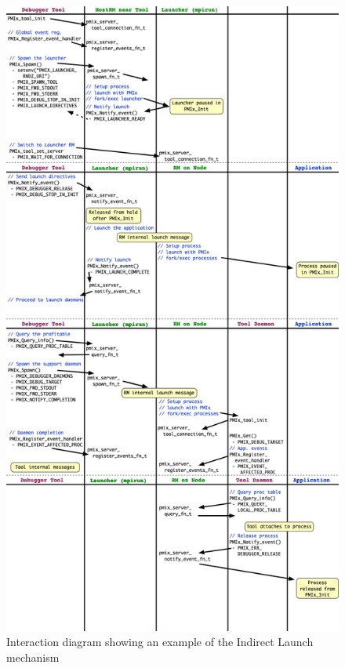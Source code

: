 \begingroup
\begin{figure}
  \begin{center}
    \includegraphics[width=\textwidth,height=\textheight,keepaspectratio]{figs/indirect-launch}
  \end{center}
  \caption{Interaction diagram showing an example of the Indirect Launch mechanism}
  \label{fig:indirect_launch}
\end{figure}
\endgroup


